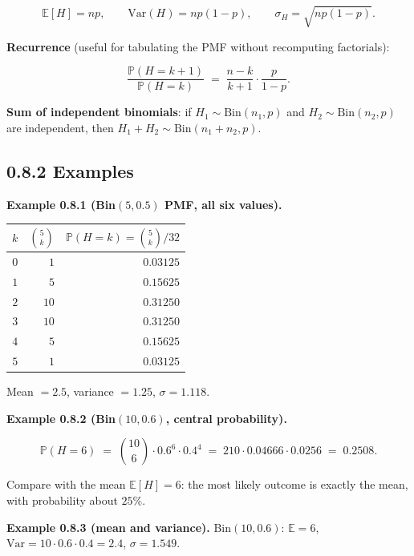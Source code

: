 \documentclass[
  10pt,
  twoside]{book}
\newcounter{none} %
\begin{document}
\[\mathbb{E}[H] = np, \qquad \mathrm{Var}(H) = np(1-p), \qquad \sigma_H = \sqrt{np(1-p)}.\]

\textbf{Recurrence} (useful for tabulating the PMF without recomputing
factorials):

\[\frac{\mathbb{P}(H = k+1)}{\mathbb{P}(H = k)} \;=\; \frac{n - k}{k + 1} \cdot \frac{p}{1 - p}.\]

\textbf{Sum of independent binomials}: if
\(H_1 \sim \mathrm{Bin}(n_1, p)\) and \(H_2 \sim \mathrm{Bin}(n_2, p)\)
are independent, then \(H_1 + H_2 \sim \mathrm{Bin}(n_1 + n_2, p)\).

\subsection{0.8.2 Examples}\label{examples-7}

\textbf{Example 0.8.1 (Bin\((5, 0.5)\) PMF, all six values).}

{\def\LTcaptype{none} %
\begin{table}[H]
\centering
\begin{tabular}{|r|r|r|}
\toprule
\(k\) & \(\binom{5}{k}\) & \(\mathbb{P}(H = k) = \binom{5}{k}/32\) \\
\midrule



\(0\) & \(1\) & \(0.03125\) \\
\(1\) & \(5\) & \(0.15625\) \\
\(2\) & \(10\) & \(0.31250\) \\
\(3\) & \(10\) & \(0.31250\) \\
\(4\) & \(5\) & \(0.15625\) \\
\(5\) & \(1\) & \(0.03125\) \\
\bottomrule
\end{tabular}
\end{table}
}

Mean \(= 2.5\), variance \(= 1.25\), \(\sigma = 1.118\).

\textbf{Example 0.8.2 (Bin\((10, 0.6)\), central probability).}

\[\mathbb{P}(H = 6) \;=\; \binom{10}{6} \cdot 0.6^6 \cdot 0.4^4 \;=\; 210 \cdot 0.04666 \cdot 0.0256 \;=\; 0.2508.\]

Compare with the mean \(\mathbb{E}[H] = 6\): the most likely outcome is
exactly the mean, with probability about \(25\%\).

\textbf{Example 0.8.3 (mean and variance).} Bin\((10, 0.6)\):
\(\mathbb{E} = 6\), \(\mathrm{Var} = 10 \cdot 0.6 \cdot 0.4 = 2.4\),
\(\sigma = 1.549\).
\end{document}
